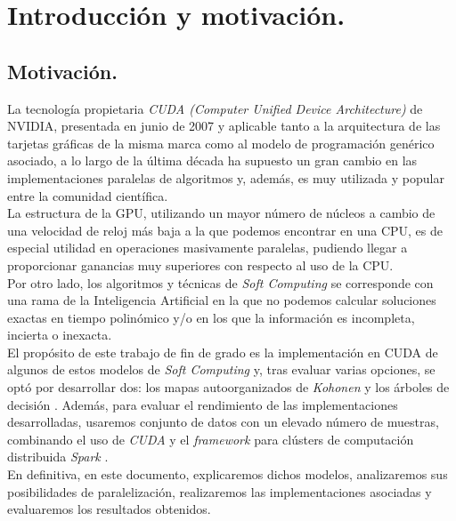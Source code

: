 \documentclass[a4paper,oneside,11pt,titlepage]{book}
\begin{document}

  
\frontmatter
\tableofcontents
\listoffigures
\listoftables

%
\mainmatter
\setlength{\parskip}{5pt}
\chapter{Introducción y motivación.}
\section{Motivación.}
La tecnología propietaria \textit{CUDA (Computer Unified Device Architecture)} \cite{cuda} de NVIDIA, presentada en junio de 2007 y aplicable tanto a la arquitectura de las tarjetas gráficas de la misma marca como al modelo de programación genérico asociado, a lo largo de la última década ha supuesto un gran cambio en las implementaciones paralelas de algoritmos y, además, es muy utilizada y popular entre la comunidad científica.\\

La estructura de la GPU, utilizando un mayor número de núcleos a cambio de una velocidad de reloj más baja a la que podemos encontrar en una CPU, es de especial utilidad en operaciones masivamente paralelas, pudiendo llegar a proporcionar ganancias muy superiores con respecto al uso de la CPU.\\

Por otro lado, los algoritmos y técnicas de \textit{Soft Computing} se corresponde con una rama de la Inteligencia Artificial en la que no podemos calcular soluciones exactas en tiempo polinómico y/o en los que la información es incompleta, incierta o inexacta.\\

El propósito de este trabajo de fin de grado es la implementación en CUDA de algunos de estos modelos de \textit{Soft Computing} y, tras evaluar varias opciones, se optó por desarrollar dos: los mapas autoorganizados de \textit{Kohonen} \cite{kohonensom} y los árboles de decisión \cite{arbol}. Además, para evaluar el rendimiento de las implementaciones desarrolladas, usaremos conjunto de datos con un elevado número de muestras, combinando el uso de \textit{CUDA} y el \textit{framework} para clústers de computación distribuida \textit{Spark} \cite{spark}.\\

En definitiva, en este documento, explicaremos dichos modelos, analizaremos sus posibilidades de paralelización, realizaremos las implementaciones asociadas y evaluaremos los resultados obtenidos.
\end{document}
